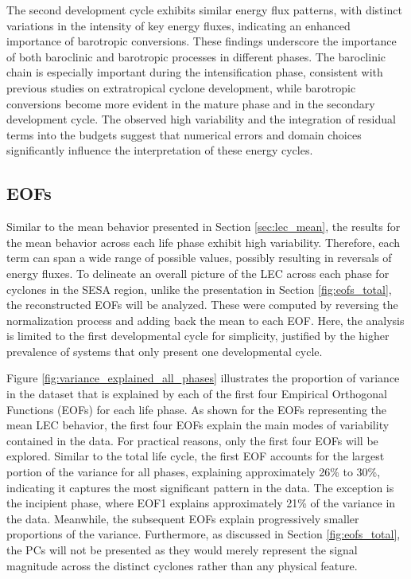 The second development cycle exhibits similar energy flux patterns, with distinct variations in the intensity of key energy fluxes, indicating an enhanced importance of barotropic conversions. These findings underscore the importance of both baroclinic and barotropic processes in different phases. The baroclinic chain is especially important during the intensification phase, consistent with previous studies on extratropical cyclone development, while barotropic conversions become more evident in the mature phase and in the secondary development cycle. The observed high variability and the integration of residual terms into the budgets suggest that numerical errors and domain choices significantly influence the interpretation of these energy cycles.

\subsection{EOFs}\label{sec:eof_phases}


Similar to the mean behavior presented in Section \ref{sec:lec_mean}, the results for the mean behavior across each life phase exhibit high variability. Therefore, each term can span a wide range of possible values, possibly resulting in reversals of energy fluxes. To delineate an overall picture of the LEC across each phase for cyclones in the SESA region, unlike the presentation in Section \ref{fig:eofs_total}, the reconstructed EOFs will be analyzed. These were computed by reversing the normalization process and adding back the mean to each EOF. Here, the analysis is limited to the first developmental cycle for simplicity, justified by the higher prevalence of systems that only present one developmental cycle.

Figure \ref{fig:variance_explained_all_phases} illustrates the proportion of variance in the dataset that is explained by each of the first four Empirical Orthogonal Functions (EOFs) for each life phase. As shown for the EOFs representing the mean LEC behavior, the first four EOFs explain the main modes of variability contained in the data. For practical reasons, only the first four EOFs will be explored. Similar to the total life cycle, the first EOF accounts for the largest portion of the variance for all phases, explaining approximately 26\% to 30\%, indicating it captures the most significant pattern in the data. The exception is the incipient phase, where EOF1 explains approximately 21\% of the variance in the data. Meanwhile, the subsequent EOFs explain progressively smaller proportions of the variance. Furthermore, as discussed in Section \ref{fig:eofs_total}, the PCs will not be presented as they would merely represent the signal magnitude across the distinct cyclones rather than any physical feature.

